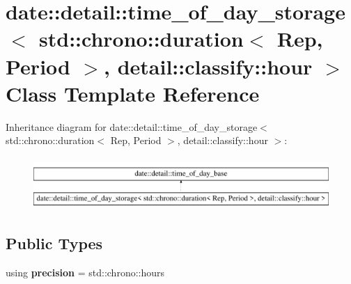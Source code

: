 \hypertarget{classdate_1_1detail_1_1time__of__day__storage_3_01std_1_1chrono_1_1duration_3_01_rep_00_01_periof6e2d5ee0d1e3852f1e52c62f81e1bb7}{}\section{date\+::detail\+::time\+\_\+of\+\_\+day\+\_\+storage$<$ std\+::chrono\+::duration$<$ Rep, Period $>$, detail\+::classify\+::hour $>$ Class Template Reference}
\label{classdate_1_1detail_1_1time__of__day__storage_3_01std_1_1chrono_1_1duration_3_01_rep_00_01_periof6e2d5ee0d1e3852f1e52c62f81e1bb7}
Inheritance diagram for date\+::detail\+::time\+\_\+of\+\_\+day\+\_\+storage$<$ std\+::chrono\+::duration$<$ Rep, Period $>$, detail\+::classify\+::hour $>$\+:\begin{figure}[H]
\begin{center}
\leavevmode
\includegraphics[height=2.000000cm]{classdate_1_1detail_1_1time__of__day__storage_3_01std_1_1chrono_1_1duration_3_01_rep_00_01_periof6e2d5ee0d1e3852f1e52c62f81e1bb7}
\end{center}
\end{figure}
\subsection*{Public Types}
\begin{DoxyCompactItemize}
\item 
\mbox{\label{classdate_1_1detail_1_1time__of__day__storage_3_01std_1_1chrono_1_1duration_3_01_rep_00_01_periof6e2d5ee0d1e3852f1e52c62f81e1bb7_af8e4f3ea602ea949957c92d33392c715}} 
using {\bfseries precision} = std\+::chrono\+::hours
\end{DoxyCompactItemize}
